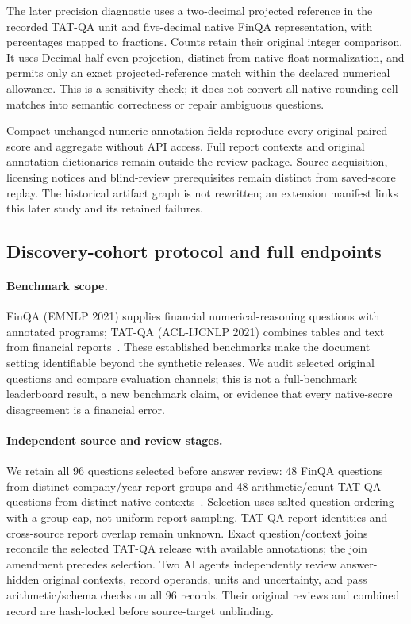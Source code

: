 The later precision diagnostic uses a two-decimal projected reference in the recorded TAT-QA unit and five-decimal native FinQA representation, with percentages mapped to fractions. Counts retain their original integer comparison. It uses Decimal half-even projection, distinct from native float normalization, and permits only an exact projected-reference match within the declared numerical allowance. This is a sensitivity check; it does not convert all native rounding-cell matches into semantic correctness or repair ambiguous questions.

Compact unchanged numeric annotation fields reproduce every original paired score and aggregate without API access. Full report contexts and original annotation dictionaries remain outside the review package. Source acquisition, licensing notices and blind-review prerequisites remain distinct from saved-score replay. The historical artifact graph is not rewritten; an extension manifest links this later study and its retained failures.

\subsection{Discovery-cohort protocol and full endpoints}
\paragraph{Benchmark scope.} FinQA (EMNLP 2021) supplies financial numerical-reasoning questions with annotated programs; TAT-QA (ACL-IJCNLP 2021) combines tables and text from financial reports~\cite{finqa,tatqa}. These established benchmarks make the document setting identifiable beyond the synthetic releases. We audit selected original questions and compare evaluation channels; this is not a full-benchmark leaderboard result, a new benchmark claim, or evidence that every native-score disagreement is a financial error.
\paragraph{Independent source and review stages.} We retain all 96 questions selected before answer review: 48 FinQA questions from distinct company/year report groups and 48 arithmetic/count TAT-QA questions from distinct native contexts~\cite{finqa,tatqa}. Selection uses salted question ordering with a group cap, not uniform report sampling. TAT-QA report identities and cross-source report overlap remain unknown. Exact question/context joins reconcile the selected TAT-QA release with available annotations; the join amendment precedes selection. Two AI agents independently review answer-hidden original contexts, record operands, units and uncertainty, and pass arithmetic/schema checks on all 96 records. Their original reviews and combined record are hash-locked before source-target unblinding.


